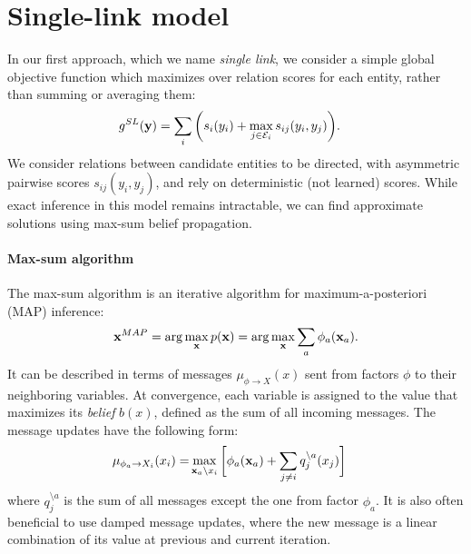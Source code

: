 


\section{Single-link model}

In our first approach, which we name \emph{single link}, we consider a simple global objective function which maximizes over relation scores for each entity, rather than summing or averaging them:
\begin{align}
g^{SL}({\bf y}) &= \sum_i \bigg( s_i(y_i) + \max_{ j \in \mathcal{E}_i} s_{ij}(y_i, y_j) \bigg).
\end{align}
We consider relations between candidate entities to be directed, with asymmetric pairwise scores $s_{ij}(y_i, y_j)$, and rely on deterministic (not learned) scores. 
While exact inference in this model remains intractable, we can find approximate solutions using max-sum belief propagation. 

\paragraph{Max-sum algorithm} 
The max-sum algorithm is an iterative algorithm for maximum-a-posteriori (MAP) inference:
\begin{equation}
{\bf x}^{MAP} = \arg \max_{\bf x} p({\bf x}) = \arg \max_{\bf x} \sum_a \phi_a({\bf x}_a).
\end{equation}
 It can be described in terms of messages $\mu_{\phi \rightarrow X}(x)$ sent from factors $\phi$ to their neighboring variables. At convergence, each variable is assigned to the value that maximizes its \emph{belief} $b(x)$, defined as the sum of all incoming messages. The message updates have the following form:
\begin{align}
\mu_{\phi_a \rightarrow X_i}(x_i) =& \max_{ {\bf x}_a \setminus x_i } \bigg[ \phi_a({\bf x}_a) + \sum_{j \neq i} q_j^{\setminus a}(x_j)\bigg]
\label{eq:damping}
\end{align}
\noindent where $q_j^{\setminus a}$ is the sum of all messages except the one from factor $\phi_a$.  It is also often beneficial to use damped message updates, where the new message is a linear combination of its value at previous and current iteration.

